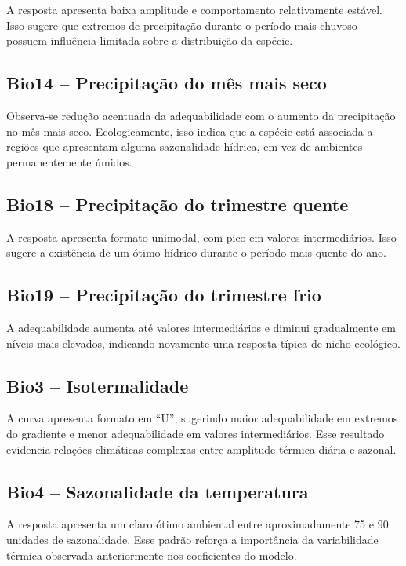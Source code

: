 A resposta apresenta baixa amplitude e comportamento relativamente estável. Isso sugere que extremos de precipitação durante o período mais chuvoso possuem influência limitada sobre a distribuição da espécie.

\subsection*{Bio14 -- Precipitação do mês mais seco}

Observa-se redução acentuada da adequabilidade com o aumento da precipitação no mês mais seco. Ecologicamente, isso indica que a espécie está associada a regiões que apresentam alguma sazonalidade hídrica, em vez de ambientes permanentemente úmidos.

\subsection*{Bio18 -- Precipitação do trimestre quente}

A resposta apresenta formato unimodal, com pico em valores intermediários. Isso sugere a existência de um ótimo hídrico durante o período mais quente do ano.

\subsection*{Bio19 -- Precipitação do trimestre frio}

A adequabilidade aumenta até valores intermediários e diminui gradualmente em níveis mais elevados, indicando novamente uma resposta típica de nicho ecológico.

\subsection*{Bio3 -- Isotermalidade}

A curva apresenta formato em ``U'', sugerindo maior adequabilidade em extremos do gradiente e menor adequabilidade em valores intermediários. Esse resultado evidencia relações climáticas complexas entre amplitude térmica diária e sazonal.

\subsection*{Bio4 -- Sazonalidade da temperatura}

A resposta apresenta um claro ótimo ambiental entre aproximadamente 75 e 90 unidades de sazonalidade. Esse padrão reforça a importância da variabilidade térmica observada anteriormente nos coeficientes do modelo.

